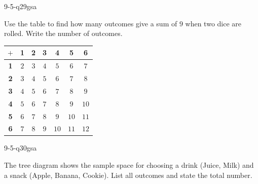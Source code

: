 \begin{practiceQuestion}{9-5-q29}{gsa}
\begin{questionText}
Use the table to find how many outcomes give a sum of $9$ when two dice are rolled. Write the number of outcomes.

\begin{center}
\begin{tabular}{|c|c|c|c|c|c|c|}
\hline
$+$ & \textbf{1} & \textbf{2} & \textbf{3} & \textbf{4} & \textbf{5} & \textbf{6} \\
\hline
\textbf{1} & $2$ & $3$ & $4$ & $5$ & $6$ & $7$ \\
\hline
\textbf{2} & $3$ & $4$ & $5$ & $6$ & $7$ & $8$ \\
\hline
\textbf{3} & $4$ & $5$ & $6$ & $7$ & $8$ & $9$ \\
\hline
\textbf{4} & $5$ & $6$ & $7$ & $8$ & $9$ & $10$ \\
\hline
\textbf{5} & $6$ & $7$ & $8$ & $9$ & $10$ & $11$ \\
\hline
\textbf{6} & $7$ & $8$ & $9$ & $10$ & $11$ & $12$ \\
\hline
\end{tabular}
\end{center}
\end{questionText}
\end{practiceQuestion}

\begin{practiceQuestion}{9-5-q30}{gsa}
\begin{questionText}
The tree diagram shows the sample space for choosing a drink (Juice, Milk) and a snack (Apple, Banana, Cookie). List all outcomes and state the total number.

\begin{center}
\end{center}
\end{questionText}
\end{practiceQuestion}
